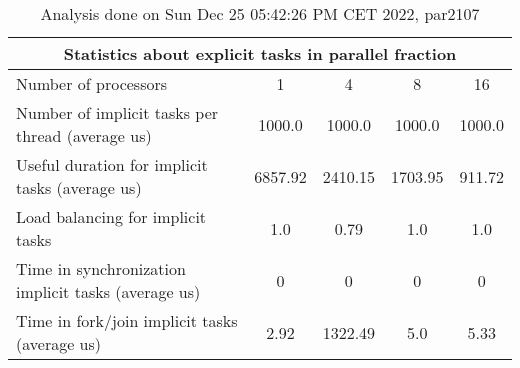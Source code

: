 \begin{table}[h]
\begin{center}
\begin{tabular}{|l|c|c|c|c|}
\hline
\multicolumn{5}{|c|}{Statistics about explicit tasks in parallel fraction} \\
\hline
\hline
Number of processors & 1 & 4 & 8 & 16 \\
\hline
\hline
Number of implicit tasks per thread (average us)    &          1000.0 &          1000.0 &          1000.0 &          1000.0 \\
\hline
Useful duration for implicit tasks (average us)     &         6857.92 &         2410.15 &         1703.95 &          911.72 \\
\hline
Load balancing for implicit tasks                &             1.0 &            0.79 &             1.0 &             1.0 \\
\hline
Time in synchronization implicit tasks (average us) &               0 &               0 &               0 &               0 \\
\hline
Time in fork/join implicit tasks (average us)       &            2.92 &         1322.49 &             5.0 &            5.33 \\
\hline
\end{tabular}
\end{center}
\caption{ Analysis done on Sun Dec 25 05:42:26 PM CET 2022, par2107}
\end{table}
